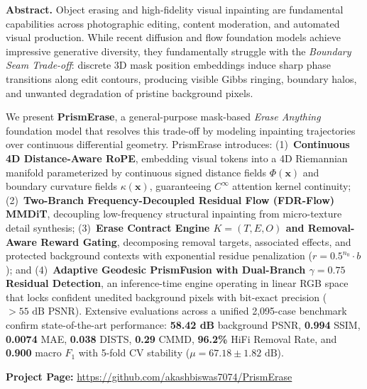 \documentclass[11pt,a4paper]{article}
\begin{document}
\begin{tcolorbox}[colback=gray!5,colframe=gray!25,arc=2.5mm,left=10pt,right=10pt,top=6pt,bottom=6pt]
\small
\textbf{Abstract.}
Object erasing and high-fidelity visual inpainting are fundamental capabilities across photographic editing, content moderation, and automated visual production. While recent diffusion and flow foundation models achieve impressive generative diversity, they fundamentally struggle with the \textit{Boundary Seam Trade-off}: discrete 3D mask position embeddings induce sharp phase transitions along edit contours, producing visible Gibbs ringing, boundary halos, and unwanted degradation of pristine background pixels. 

We present \textbf{PrismErase}, a general-purpose mask-based \textit{Erase Anything} foundation model that resolves this trade-off by modeling inpainting trajectories over continuous differential geometry. PrismErase introduces: (1)~\textbf{Continuous 4D Distance-Aware RoPE}, embedding visual tokens into a 4D Riemannian manifold parameterized by continuous signed distance fields $\Phi(\mathbf{x})$ and boundary curvature fields $\kappa(\mathbf{x})$, guaranteeing $C^\infty$ attention kernel continuity; (2)~\textbf{Two-Branch Frequency-Decoupled Residual Flow (FDR-Flow) MMDiT}, decoupling low-frequency structural inpainting from micro-texture detail synthesis; (3)~\textbf{Erase Contract Engine $K = (T, E, O)$ and Removal-Aware Reward Gating}, decomposing removal targets, associated effects, and protected background contexts with exponential residue penalization ($r = 0.5^{n_0} \cdot b$); and (4)~\textbf{Adaptive Geodesic PrismFusion with Dual-Branch $\gamma=0.75$ Residual Detection}, an inference-time engine operating in linear RGB space that locks confident unedited background pixels with bit-exact precision ($>55\text{ dB}$ PSNR). Extensive evaluations across a unified 2,095-case benchmark confirm state-of-the-art performance: \textbf{58.42 dB} background PSNR, \textbf{0.994} SSIM, \textbf{0.0074} MAE, \textbf{0.038} DISTS, \textbf{0.29} CMMD, \textbf{96.2\%} HiFi Removal Rate, and \textbf{0.900} macro $F_1$ with 5-fold CV stability ($\mu = 67.18 \pm 1.82\text{ dB}$).

\vspace{3pt}
\noindent\textbf{Project Page:} \url{https://github.com/akashbiswas7074/PrismErase}
\end{tcolorbox}

\newpage
\end{document}
